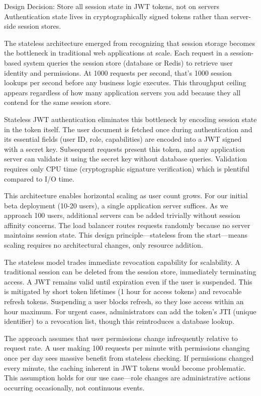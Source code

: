 \documentclass[12pt,a4paper]{article}
\begin{document}
\begin{rationale}{Design Decision: Store all session state in JWT tokens, not on servers}
Authentication state lives in cryptographically signed tokens rather than server-side session stores.
\end{rationale}

The stateless architecture emerged from recognizing that session storage becomes the bottleneck in traditional web applications at scale. Each request in a session-based system queries the session store (database or Redis) to retrieve user identity and permissions. At 1000 requests per second, that's 1000 session lookups per second before any business logic executes. This throughput ceiling appears regardless of how many application servers you add because they all contend for the same session store.

Stateless JWT authentication eliminates this bottleneck by encoding session state in the token itself. The user document is fetched once during authentication and its essential fields (user ID, role, capabilities) are encoded into a JWT signed with a secret key. Subsequent requests present this token, and any application server can validate it using the secret key without database queries. Validation requires only CPU time (cryptographic signature verification) which is plentiful compared to I/O time.

This architecture enables horizontal scaling as user count grows. For our initial beta deployment (10-20 users), a single application server suffices. As we approach 100 users, additional servers can be added trivially without session affinity concerns. The load balancer routes requests randomly because no server maintains session state. This design principle—stateless from the start—means scaling requires no architectural changes, only resource addition.

The stateless model trades immediate revocation capability for scalability. A traditional session can be deleted from the session store, immediately terminating access. A JWT remains valid until expiration even if the user is suspended. This is mitigated by short token lifetimes (1 hour for access tokens) and revocable refresh tokens. Suspending a user blocks refresh, so they lose access within an hour maximum. For urgent cases, administrators can add the token's JTI (unique identifier) to a revocation list, though this reintroduces a database lookup.

The approach assumes that user permissions change infrequently relative to request rate. A user making 100 requests per minute with permissions changing once per day sees massive benefit from stateless checking. If permissions changed every minute, the caching inherent in JWT tokens would become problematic. This assumption holds for our use case—role changes are administrative actions occurring occasionally, not continuous events.
\end{document}
